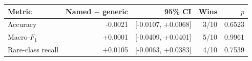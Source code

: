 \begin{tabular}{@{}lrrrr@{}}
\toprule
Metric & Named $-$ generic & 95\% CI & Wins & $p$ \\
\midrule
Accuracy & -0.0021 & [-0.0107, +0.0068] & 3/10 & 0.6523 \\
Macro-$F_1$ & +0.0001 & [-0.0409, +0.0401] & 5/10 & 0.9961 \\
Rare-class recall & +0.0105 & [-0.0063, +0.0383] & 4/10 & 0.7539 \\
\bottomrule
\end{tabular}